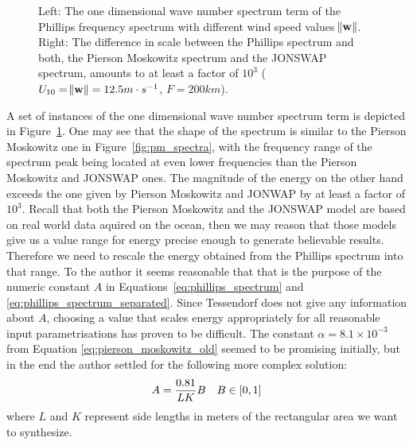 \begin{figure}
\caption{Left: The one dimensional wave number spectrum term of the Phillips 
frequency spectrum with different wind speed values $\norm{\mathbf{w}}$. Right: 
The difference in scale between the Phillips spectrum and both, the Pierson 
Moskowitz spectrum and the JONSWAP spectrum, amounts to at least a factor of 
$10^3$ ($U_{10}=\norm{\mathbf{w}}=12.5m\cdot s^{-1}$, $F=200km$).
}
\label{fig:phillips_spectra}
\end{figure}
%
A set of instances of the one dimensional wave number spectrum term is depicted 
in Figure~\ref{fig:phillips_spectra}. One may see that the shape of the 
spectrum is similar to the Pierson Moskowitz one in Figure~\ref{fig:pm_spectra}, 
with the frequency range of the spectrum peak being located at even lower 
frequencies than the Pierson Moskowitz and JONSWAP ones. The magnitude of the 
energy on the other hand exceeds the one given by Pierson Moskowitz and JONWAP 
by at least a factor of $10^3$. Recall that both the Pierson Moskowitz and the 
JONSWAP model are based on real world data aquired on the ocean, then we may 
reason that those models give us a value range for energy precise enough to 
generate believable results. Therefore we need to rescale the energy obtained 
from the Phillips spectrum into that range. To the author it seems reasonable 
that that is the purpose of the numeric constant $A$ in 
Equations~\ref{eq:phillips_spectrum} and \ref{eq:phillips_spectrum_separated}. 
Since Tessendorf does not give any information about $A$, choosing a value that 
scales energy appropriately for all reasonable input parametrisations has proven 
to be difficult. The constant $\alpha = 8.1 \times 10^{-3}$ from Equation
\ref{eq:pierson_moskowitz_old} seemed to be promising initially, but in the end 
the author settled for the following more complex solution:
\begin{align}
 A = \frac{0.81}{LK}B && B \in \interval{0}{1}
\end{align}
where $L$ and $K$ represent side lengths in meters of the rectangular area 
we want to synthesize.
%
